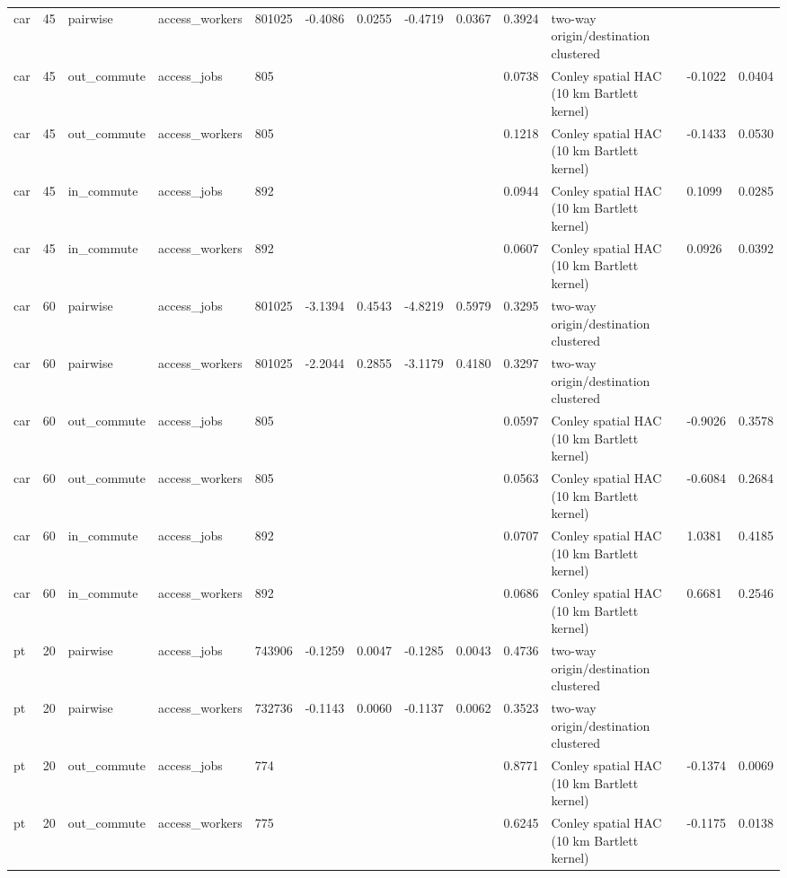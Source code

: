 \begin{table}[htbp]
\begin{tabular}{lllllllllllll}
car & 45 & pairwise & access\_workers & 801025 & -0.4086 & 0.0255 & -0.4719 & 0.0367 & 0.3924 & two-way origin/destination clustered &  &  \\
car & 45 & out\_commute & access\_jobs & 805 &  &  &  &  & 0.0738 & Conley spatial HAC (10 km Bartlett kernel) & -0.1022 & 0.0404 \\
car & 45 & out\_commute & access\_workers & 805 &  &  &  &  & 0.1218 & Conley spatial HAC (10 km Bartlett kernel) & -0.1433 & 0.0530 \\
car & 45 & in\_commute & access\_jobs & 892 &  &  &  &  & 0.0944 & Conley spatial HAC (10 km Bartlett kernel) & 0.1099 & 0.0285 \\
car & 45 & in\_commute & access\_workers & 892 &  &  &  &  & 0.0607 & Conley spatial HAC (10 km Bartlett kernel) & 0.0926 & 0.0392 \\
car & 60 & pairwise & access\_jobs & 801025 & -3.1394 & 0.4543 & -4.8219 & 0.5979 & 0.3295 & two-way origin/destination clustered &  &  \\
car & 60 & pairwise & access\_workers & 801025 & -2.2044 & 0.2855 & -3.1179 & 0.4180 & 0.3297 & two-way origin/destination clustered &  &  \\
car & 60 & out\_commute & access\_jobs & 805 &  &  &  &  & 0.0597 & Conley spatial HAC (10 km Bartlett kernel) & -0.9026 & 0.3578 \\
car & 60 & out\_commute & access\_workers & 805 &  &  &  &  & 0.0563 & Conley spatial HAC (10 km Bartlett kernel) & -0.6084 & 0.2684 \\
car & 60 & in\_commute & access\_jobs & 892 &  &  &  &  & 0.0707 & Conley spatial HAC (10 km Bartlett kernel) & 1.0381 & 0.4185 \\
car & 60 & in\_commute & access\_workers & 892 &  &  &  &  & 0.0686 & Conley spatial HAC (10 km Bartlett kernel) & 0.6681 & 0.2546 \\
pt & 20 & pairwise & access\_jobs & 743906 & -0.1259 & 0.0047 & -0.1285 & 0.0043 & 0.4736 & two-way origin/destination clustered &  &  \\
pt & 20 & pairwise & access\_workers & 732736 & -0.1143 & 0.0060 & -0.1137 & 0.0062 & 0.3523 & two-way origin/destination clustered &  &  \\
pt & 20 & out\_commute & access\_jobs & 774 &  &  &  &  & 0.8771 & Conley spatial HAC (10 km Bartlett kernel) & -0.1374 & 0.0069 \\
pt & 20 & out\_commute & access\_workers & 775 &  &  &  &  & 0.6245 & Conley spatial HAC (10 km Bartlett kernel) & -0.1175 & 0.0138 \\

\end{tabular}
\end{table}

